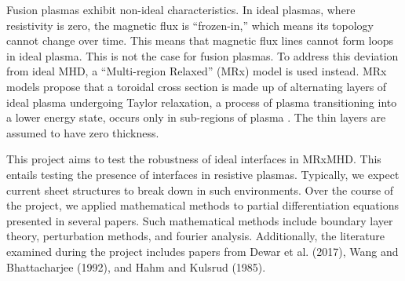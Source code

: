 \documentclass[../main.tex]{subfiles}
\begin{document}
Fusion plasmas exhibit non-ideal characteristics. In ideal plasmas, where resistivity is zero, the magnetic flux is ``frozen-in,'' which means its topology cannot change over time. This means that magnetic flux lines cannot form loops in ideal plasma. This is not the case for fusion plasmas. To address this deviation from ideal MHD, a ``Multi-region Relaxed'' (MRx) model is used instead. MRx models propose that a toroidal cross section is made up of alternating layers of ideal plasma undergoing Taylor relaxation, a process of plasma transitioning into a lower energy state, occurs only in sub-regions of plasma \cite{dewar2017}. The thin layers are assumed to have zero thickness.

This project aims to test the robustness of ideal interfaces in MRxMHD. This entails testing the presence of interfaces in resistive plasmas. Typically, we expect current sheet structures to break down in such environments. Over the course of the project, we applied mathematical methods to partial differentiation equations presented in several papers. Such mathematical methods include boundary layer theory, perturbation methods, and fourier analysis. Additionally, the literature examined during the project includes papers from Dewar et al. (2017), Wang and Bhattacharjee (1992), and Hahm and Kulsrud (1985).

\end{document}
